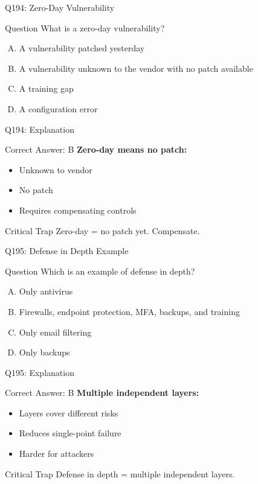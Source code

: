 \documentclass{beamer}
\begin{document}
	\begin{frame}{Q194: Zero-Day Vulnerability}
		\begin{block}{Question}
			What is a zero-day vulnerability?
		\end{block}
		\begin{enumerate}[(A)]
			\item A vulnerability patched yesterday
			\item A vulnerability unknown to the vendor with no patch available
			\item A training gap
			\item A configuration error
		\end{enumerate}
	\end{frame}
	
	\begin{frame}{Q194: Explanation}
		\begin{block}{Correct Answer: B}
			\textbf{Zero-day means no patch:}
			\begin{itemize}
				\item Unknown to vendor
				\item No patch
				\item Requires compensating controls
			\end{itemize}
		\end{block}
		\begin{alertblock}{Critical Trap}
			Zero-day = no patch yet. Compensate.
		\end{alertblock}
	\end{frame}
	
	\begin{frame}{Q195: Defense in Depth Example}
		\begin{block}{Question}
			Which is an example of defense in depth?
		\end{block}
		\begin{enumerate}[(A)]
			\item Only antivirus
			\item Firewalls, endpoint protection, MFA, backups, and training
			\item Only email filtering
			\item Only backups
		\end{enumerate}
	\end{frame}
	
	\begin{frame}{Q195: Explanation}
		\begin{block}{Correct Answer: B}
			\textbf{Multiple independent layers:}
			\begin{itemize}
				\item Layers cover different risks
				\item Reduces single-point failure
				\item Harder for attackers
			\end{itemize}
		\end{block}
		\begin{alertblock}{Critical Trap}
			Defense in depth = multiple independent layers.
		\end{alertblock}
	\end{frame}
	
\end{document}
